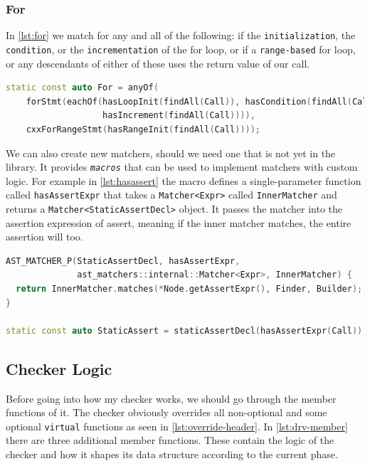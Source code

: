 \subsubsection{For}

In \cref{lst:for} we match for
any and all of the following: if the \texttt{initialization}, the \texttt{condition}, or the \texttt{incrementation} of the for
loop, or if a \texttt{range-based} for loop, or any descendants of either of these uses the return value of our call.

\begin{lstlisting}[language={C++},caption={The matcher for the usage in for statement.},label={lst:for}]
static const auto For = anyOf(
	forStmt(eachOf(hasLoopInit(findAll(Call)), hasCondition(findAll(Call)),
				   hasIncrement(findAll(Call)))),
	cxxForRangeStmt(hasRangeInit(findAll(Call))));
\end{lstlisting}

We can also create new matchers, should we need one that is not yet in the library. %
It provides \emph{\texttt{macros}} that can be used to implement matchers with custom logic. For example in \cref{lst:hasassert} the
macro defines a single-parameter function called \texttt{hasAssertExpr} that takes a \texttt{Matcher<Expr>} called
\texttt{InnerMatcher} and returns a \texttt{Matcher<StaticAssertDecl>} object. It passes the
matcher into the assertion expression of assert, meaning if the inner matcher matches, the entire assertion will too.

\begin{lstlisting}[language={C++},caption={Custom logic and usage of a new matcher called \texttt{hasAssertExpr}.},label={lst:hasassert}]
AST_MATCHER_P(StaticAssertDecl, hasAssertExpr,
              ast_matchers::internal::Matcher<Expr>, InnerMatcher) {
  return InnerMatcher.matches(*Node.getAssertExpr(), Finder, Builder);
}

static const auto StaticAssert = staticAssertDecl(hasAssertExpr(Call));
\end{lstlisting}


\subsection{Checker Logic}

Before going into how my checker works, we should go through the member functions of it. The checker obviously overrides all
non-optional and some optional \lstinline{virtual} functions as seen in \cref{lst:override-header}. In \cref{lst:drv-member}
there are three additional member functions. These contain the logic of the checker and how it shapes
its data structure according to the current phase. 

